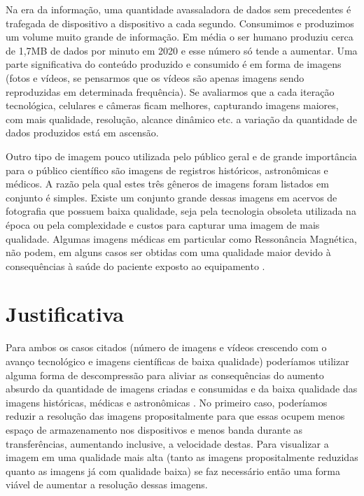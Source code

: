 Na era da informação, uma quantidade avassaladora de dados sem precedentes é trafegada de dispositivo a dispositivo a cada segundo. Consumimos e produzimos um volume muito grande de informação. Em média o ser humano produziu cerca de 1,7MB de dados por minuto em 2020 \cite{vish_how_2020} e esse número só tende a aumentar. Uma parte significativa do conteúdo produzido e consumido é em forma de imagens (fotos e vídeos, se pensarmos que os vídeos são apenas imagens sendo reproduzidas em determinada frequência). Se avaliarmos que a cada iteração tecnológica, celulares e câmeras ficam melhores, capturando imagens maiores, com mais qualidade, resolução, alcance dinâmico etc. a variação da quantidade de dados produzidos está em ascensão.

Outro tipo de imagem pouco utilizada pelo público geral e de grande importância para o público científico são imagens de registros históricos, astronômicas e médicos. A razão pela qual estes três gêneros de imagens foram listados em conjunto é simples. Existe um conjunto grande dessas imagens em acervos de fotografia que possuem baixa qualidade, seja pela tecnologia obsoleta utilizada na época ou pela complexidade e custos para capturar uma imagem de mais qualidade. Algumas imagens médicas em particular como Ressonância Magnética, não podem, em alguns casos ser obtidas com uma qualidade maior devido à consequências à saúde do paciente exposto ao equipamento \cite{gupta_super-resolution_2020}.

\section{Justificativa}
\label{justificativa}

Para ambos os casos citados (número de imagens e vídeos crescendo com o avanço tecnológico e imagens científicas de baixa qualidade) poderíamos utilizar alguma forma de descompressão para aliviar as consequências do aumento absurdo da quantidade de imagens criadas e consumidas e da baixa qualidade das imagens históricas, médicas e astronômicas \cite{sun_super_2019,noauthor_review_2020}. No primeiro caso, poderíamos reduzir a resolução das imagens propositalmente para que essas ocupem menos espaço de armazenamento nos dispositivos e menos banda durante as transferências, aumentando inclusive, a velocidade destas. Para visualizar a imagem em uma qualidade mais alta (tanto as imagens propositalmente reduzidas quanto as imagens já com qualidade baixa) se faz necessário então uma forma viável de aumentar a resolução dessas imagens. 

